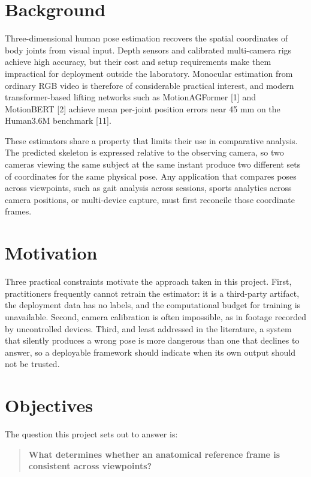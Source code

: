 \documentclass[12pt,a4paper]{report}
\begin{document}
\section{Background}

Three-dimensional human pose estimation recovers the spatial coordinates of body joints from visual input. Depth sensors and calibrated multi-camera rigs achieve high accuracy, but their cost and setup requirements make them impractical for deployment outside the laboratory. Monocular estimation from ordinary RGB video is therefore of considerable practical interest, and modern transformer-based lifting networks such as MotionAGFormer [1] and MotionBERT [2] achieve mean per-joint position errors near 45 mm on the Human3.6M benchmark [11].

These estimators share a property that limits their use in comparative analysis. The predicted skeleton is expressed relative to the observing camera, so two cameras viewing the same subject at the same instant produce two different sets of coordinates for the same physical pose. Any application that compares poses across viewpoints, such as gait analysis across sessions, sports analytics across camera positions, or multi-device capture, must first reconcile those coordinate frames.

\section{Motivation}

Three practical constraints motivate the approach taken in this project. First, practitioners frequently cannot retrain the estimator: it is a third-party artifact, the deployment data has no labels, and the computational budget for training is unavailable. Second, camera calibration is often impossible, as in footage recorded by uncontrolled devices. Third, and least addressed in the literature, a system that silently produces a wrong pose is more dangerous than one that declines to answer, so a deployable framework should indicate when its own output should not be trusted.

\section{Objectives}
\label{sec:objectives}

The question this project sets out to answer is:

\begin{quote}
\textbf{What determines whether an anatomical reference frame is consistent across viewpoints?}
\end{quote}
\end{document}
